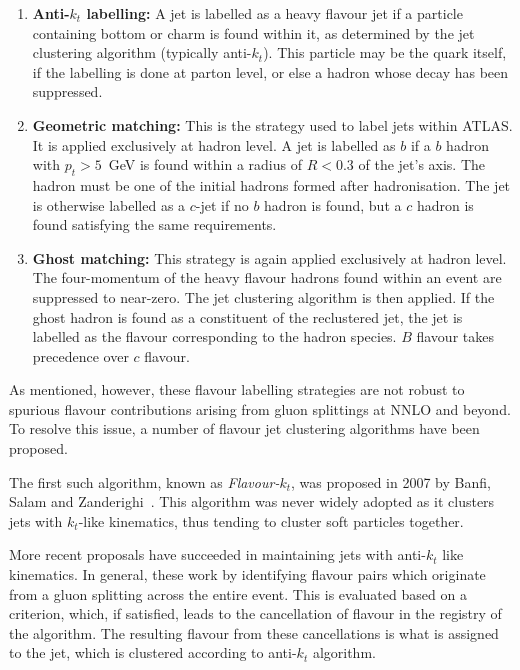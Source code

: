 \documentclass[10pt,a4paper]{book}
\begin{document}
\begin{enumerate}
    \item \textbf{Anti-$k_t$ labelling:} A jet is labelled as a heavy flavour jet if a particle containing bottom or charm is found within it, as determined by the jet clustering algorithm (typically anti-$k_t$). This particle may be the quark itself, if the labelling is done at parton level, or else a hadron whose decay has been suppressed.
    \item \textbf{Geometric matching:} This is the strategy used to label jets within ATLAS. It is applied exclusively at hadron level. A jet is labelled as $b$ if a $b$ hadron with $p_t > 5$~GeV is found within a radius of $R < 0.3$ of the jet's axis. The hadron must be one of the initial hadrons formed after hadronisation. The jet is otherwise labelled as a $c$-jet if no $b$ hadron is found, but a $c$ hadron is found satisfying the same requirements.
    \item \textbf{Ghost matching:} This strategy is again applied exclusively at hadron level. The four-momentum of the heavy flavour hadrons found within an event are suppressed to near-zero. The jet clustering algorithm is then applied. If the ghost hadron is found as a constituent of the reclustered jet, the jet is labelled as the flavour corresponding to the hadron species. $B$ flavour takes precedence over $c$ flavour.
\end{enumerate}

As mentioned, however, these flavour labelling strategies are not robust to spurious flavour contributions arising from gluon splittings at NNLO and beyond. To resolve this issue, a number of 
flavour jet clustering algorithms have been proposed.

The first such algorithm, known as \emph{Flavour-$k_t$}, was proposed in 2007 by Banfi, Salam and Zanderighi~\cite{Banfi:2007gu}. This algorithm was never widely adopted as it clusters jets with $k_t$-like kinematics, thus tending to cluster soft particles together.

More recent proposals have succeeded in maintaining jets with anti-$k_t$ like kinematics. In general, these work by identifying flavour pairs which originate from a gluon splitting across the entire event. This is evaluated based on a criterion, which, if satisfied, leads to the cancellation of flavour in the registry of the algorithm. The resulting flavour from these cancellations is what is assigned to the jet, which is clustered according to anti-$k_t$ algorithm. 
\end{document}
